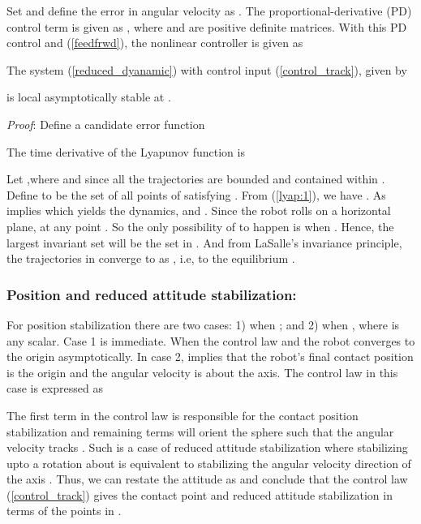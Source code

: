 \documentclass{ifacconf}
\begin{document}
Set  and define the error in angular velocity as . The proportional-derivative (PD) control term is given as , 
where  and  are positive definite matrices. With this PD control and (\ref{feedfrwd}), the nonlinear controller is given as

\begin{thm}
The system (\ref{reduced_dyanamic}) with control input (\ref{control_track}), given by

is local asymptotically stable at .
\end{thm}
\textit{Proof}: Define a candidate error function

The time derivative of the Lyapunov function is

Let ,where  and since  all the trajectories are bounded and contained within . Define  to be the set of all points  of  satisfying . From (\ref{lyap:1}), we have . As  implies  which yields the dynamics,  and . Since the robot rolls on a horizontal plane, at any point . So the only possibility of  to happen is when . Hence, the largest invariant set will be the set  in . And from LaSalle's invariance principle, the trajectories in  converge to  as , i.e, to the equilibrium . 
\subsubsection*{Position and reduced attitude stabilization:} 
For position stabilization there are two cases: 1) when     ; and 2) when   , where  is any scalar. Case 1 is immediate. When  the control law  and the robot converges to the origin asymptotically. In case 2,  implies that the robot's final contact position is the origin and the angular velocity is about the axis. The control law in this case is expressed as 

The first term in the control law is responsible for the contact position stabilization and remaining terms will orient the sphere such that the angular velocity tracks . Such is a case of reduced attitude stabilization where stabilizing  upto a rotation about  is equivalent to stabilizing the angular velocity direction of the axis  \citep{bullo_murray_track}. Thus, we can restate the attitude as  and conclude that the control law (\ref{control_track}) gives the contact point and reduced attitude stabilization in terms of the points in . 
\end{document}

